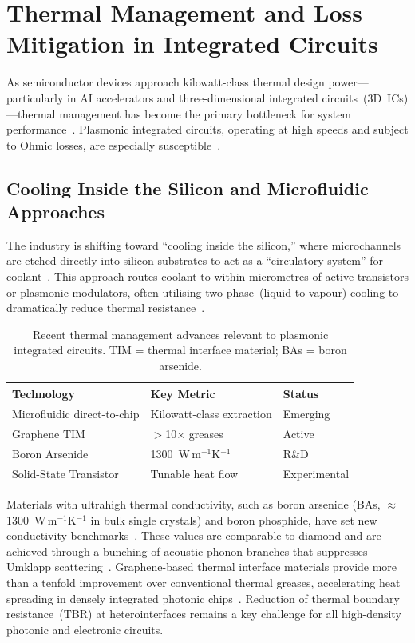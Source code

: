 \documentclass[twocolumn,10pt]{article}
\begin{document}
\section{Thermal Management and Loss Mitigation in Integrated Circuits}
\label{sec:thermal}

As semiconductor devices approach kilowatt-class thermal design
power---particularly in AI accelerators and three-dimensional integrated
circuits~(3D~ICs)---thermal management has become the primary bottleneck
for system performance~\cite{garimella2008thermal,balandin2011thermal}.
Plasmonic integrated circuits, operating at high speeds and subject to
Ohmic losses, are especially susceptible~\cite{novotny2012principles,haffner2015allplasmonic}.

\subsection{Cooling Inside the Silicon and Microfluidic Approaches}

The industry is shifting toward ``cooling inside the silicon,'' where
microchannels are etched directly into silicon substrates to act as a
``circulatory system'' for coolant~\cite{garimella2008thermal}.  This
approach routes coolant to within micrometres of active transistors or
plasmonic modulators, often utilising two-phase~(liquid-to-vapour)
cooling to dramatically reduce thermal resistance~\cite{garimella2008thermal}.

\begin{table}[H]
\small
\centering
\caption{Recent thermal management advances relevant to plasmonic
integrated circuits.  TIM = thermal interface material;
BAs = boron arsenide.}
\label{tab:thermal}
\begin{tabularx}{\columnwidth}{@{}lXX@{}}
\toprule
\textbf{Technology} & \textbf{Key Metric} & \textbf{Status} \\
\midrule
Microfluidic direct-to-chip & Kilowatt-class extraction & Emerging \\
Graphene TIM & $>$10$\times$ greases & Active \\
Boron Arsenide & 1300~W\,m$^{-1}$K$^{-1}$ & R\&D \\
Solid-State Transistor & Tunable heat flow & Experimental \\
\bottomrule
\end{tabularx}
\end{table}

Materials with ultrahigh thermal conductivity, such as boron arsenide
(BAs, $\approx$1300~W\,m$^{-1}$K$^{-1}$ in bulk single crystals) and
boron phosphide, have set new conductivity benchmarks~\cite{tian2018unusual}.
These values are comparable to diamond and are achieved through a
bunching of acoustic phonon branches that suppresses Umklapp
scattering~\cite{tian2018unusual}.  Graphene-based thermal interface
materials provide more than a tenfold improvement over conventional
thermal greases, accelerating heat spreading in densely integrated
photonic chips~\cite{balandin2011thermal}.  Reduction of thermal
boundary resistance~(TBR) at heterointerfaces remains a key challenge
for all high-density photonic and electronic circuits.
\end{document}
